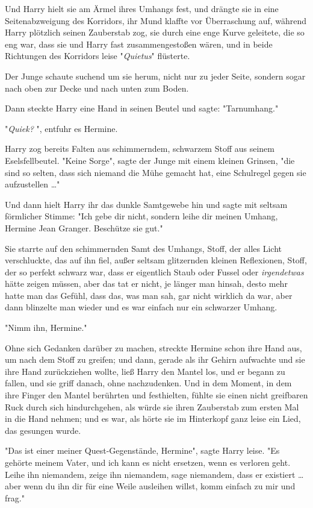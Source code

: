 {Und Harry hielt sie am Ärmel ihres Umhangs fest, und drängte sie in eine Seitenabzweigung des Korridors, ihr Mund klaffte vor Überraschung auf, während Harry plötzlich seinen Zauberstab zog, sie durch eine enge Kurve geleitete, die so eng war, dass sie und Harry fast zusammengestoßen wären, und in beide Richtungen des Korridors leise "\emph{Quietus}" flüsterte.

Der Junge schaute suchend um sie herum, nicht nur zu jeder Seite, sondern sogar nach oben zur Decke und nach unten zum Boden.

Dann steckte Harry eine Hand in seinen Beutel und sagte: "Tarnumhang."

"\emph{Quiek?} ", entfuhr es Hermine.

Harry zog bereits Falten aus schimmerndem, schwarzem Stoff aus seinem Eselsfellbeutel. "Keine Sorge", sagte der Junge mit einem kleinen Grinsen, "die sind so selten, dass sich niemand die Mühe gemacht hat, eine Schulregel gegen sie aufzustellen …"

Und dann hielt Harry ihr das dunkle Samtgewebe hin und sagte mit seltsam förmlicher Stimme: "Ich gebe dir nicht, sondern leihe dir meinen Umhang, Hermine Jean Granger. Beschütze sie gut."

Sie starrte auf den schimmernden Samt des Umhangs, Stoff, der alles Licht verschluckte, das auf ihn fiel, außer seltsam glitzernden kleinen Reflexionen, Stoff, der so perfekt schwarz war, dass er eigentlich Staub oder Fussel oder \emph{irgendetwas} hätte zeigen müssen, aber das tat er nicht, je länger man hinsah, desto mehr hatte man das Gefühl, dass das, was man sah, gar nicht wirklich da war, aber dann blinzelte man wieder und es war einfach nur ein schwarzer Umhang.

"Nimm ihn, Hermine."

Ohne sich Gedanken darüber zu machen, streckte Hermine schon ihre Hand aus, um nach dem Stoff zu greifen; und dann, gerade als ihr Gehirn aufwachte und sie ihre Hand zurückziehen wollte, ließ Harry den Mantel los, und er begann zu fallen, und sie griff danach, ohne nachzudenken. Und in dem Moment, in dem ihre Finger den Mantel berührten und festhielten, fühlte sie einen nicht greifbaren Ruck durch sich hindurchgehen, als würde sie ihren Zauberstab zum ersten Mal in die Hand nehmen; und es war, als hörte sie im Hinterkopf ganz leise ein Lied, das gesungen wurde.

"Das ist einer meiner Quest-Gegenstände, Hermine", sagte Harry leise. "Es gehörte meinem Vater, und ich kann es nicht ersetzen, wenn es verloren geht. Leihe ihn niemandem, zeige ihn niemandem, sage niemandem, dass er existiert … aber wenn du ihn dir für eine Weile ausleihen willst, komm einfach zu mir und frag."

}
